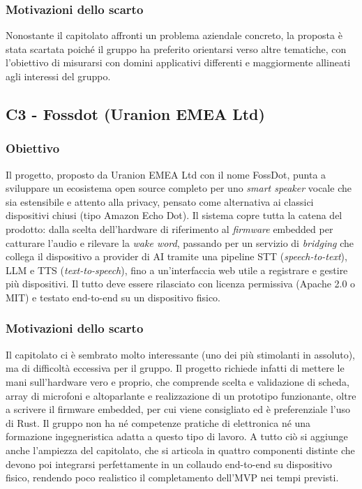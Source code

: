 \documentclass[11pt, a4paper]{article}
\begin{document}
\subsubsection{Motivazioni dello scarto}
Nonostante il capitolato affronti un problema aziendale concreto, la proposta è stata scartata poiché il gruppo ha preferito orientarsi verso altre tematiche, con l'obiettivo di misurarsi con domini applicativi differenti e maggiormente allineati agli interessi del gruppo.

\subsection{C3 - Fossdot (Uranion EMEA Ltd)}

\subsubsection{Obiettivo}
Il progetto, proposto da Uranion EMEA Ltd con il nome FossDot, punta a sviluppare un ecosistema open source completo per uno \textit{smart speaker} vocale che sia estensibile e attento alla privacy, pensato come alternativa ai classici dispositivi chiusi (tipo Amazon Echo Dot). Il sistema copre tutta la catena del prodotto: dalla scelta dell'hardware di riferimento al \textit{firmware} embedded per catturare l'audio e rilevare la \textit{wake word}, passando per un servizio di \textit{bridging} che collega il dispositivo a provider di AI tramite una pipeline STT (\textit{speech-to-text}), LLM e TTS (\textit{text-to-speech}), fino a un'interfaccia web utile a registrare e gestire più dispositivi. Il tutto deve essere rilasciato con licenza permissiva (Apache 2.0 o MIT) e testato end-to-end su un dispositivo fisico.

\subsubsection{Motivazioni dello scarto}
Il capitolato ci è sembrato molto interessante (uno dei più stimolanti in assoluto), ma di difficoltà eccessiva per il gruppo. Il progetto richiede infatti di mettere le mani sull'hardware vero e proprio, che comprende scelta e validazione di scheda, array di microfoni e altoparlante e realizzazione di un prototipo funzionante, oltre a scrivere il firmware embedded, per cui viene consigliato ed è preferenziale l'uso di Rust. Il gruppo non ha né competenze pratiche di elettronica né una formazione ingegneristica adatta a questo tipo di lavoro. A tutto ciò si aggiunge anche l'ampiezza del capitolato, che si articola in quattro componenti distinte che devono poi integrarsi perfettamente in un collaudo end-to-end su dispositivo fisico, rendendo poco realistico il completamento dell'MVP nei tempi previsti.
\end{document}
